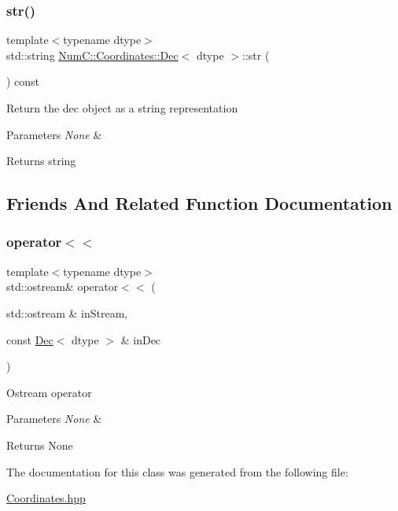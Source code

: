 \subsubsection{\texorpdfstring{str()}{str()}}
{\footnotesize\ttfamily template$<$typename dtype$>$ \\
std\+::string \mbox{\hyperlink{class_num_c_1_1_coordinates_1_1_dec}{Num\+C\+::\+Coordinates\+::\+Dec}}$<$ dtype $>$\+::str (\begin{DoxyParamCaption}{ }\end{DoxyParamCaption}) const\hspace{0.3cm}{\ttfamily [inline]}}

Return the dec object as a string representation


\begin{DoxyParams}{Parameters}
{\em None} & \\
\hline
\end{DoxyParams}
\begin{DoxyReturn}{Returns}
string 
\end{DoxyReturn}


\subsection{Friends And Related Function Documentation}
\mbox{\label{class_num_c_1_1_coordinates_1_1_dec_aa501ef35ac052d5084d792bfcde2345f}} 
\subsubsection{\texorpdfstring{operator$<$$<$}{operator<<}}
{\footnotesize\ttfamily template$<$typename dtype$>$ \\
std\+::ostream\& operator$<$$<$ (\begin{DoxyParamCaption}\item[{std\+::ostream \&}]{in\+Stream,  }\item[{const \mbox{\hyperlink{class_num_c_1_1_coordinates_1_1_dec}{Dec}}$<$ dtype $>$ \&}]{in\+Dec }\end{DoxyParamCaption})\hspace{0.3cm}{\ttfamily [friend]}}

Ostream operator


\begin{DoxyParams}{Parameters}
{\em None} & \\
\hline
\end{DoxyParams}
\begin{DoxyReturn}{Returns}
None 
\end{DoxyReturn}


The documentation for this class was generated from the following file\+:\begin{DoxyCompactItemize}
\item 
\mbox{\hyperlink{_coordinates_8hpp}{Coordinates.\+hpp}}\end{DoxyCompactItemize}
